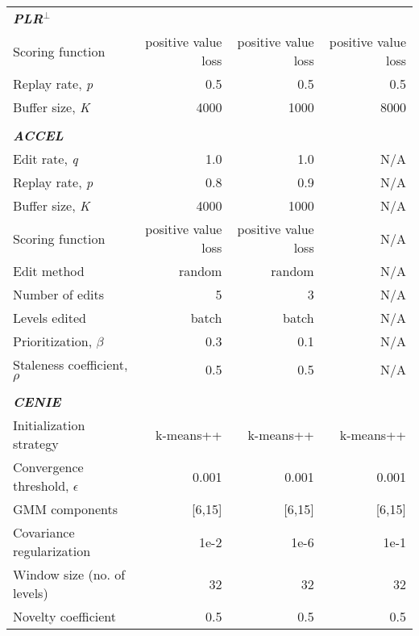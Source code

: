 \begin{table}[h]
\begin{tabular}{lrrr}
        \\
        {\em \textbf{PLR}$^\perp$} & \text{ }     & \text{ }  &  \text{ }    \\
        Scoring function   &   positive value loss   & positive value loss  &  positive value loss  \\
        Replay rate, \em{p}    &   0.5    &     0.5   & 0.5     \\
        Buffer size, \em{K}       &  4000   &   1000  &  8000      \\
        \\
        {\em \textbf{ACCEL}}  & \text{ }     & \text{ }   & \text{ }   \\
        Edit rate, \em{q}  &    1.0      &    1.0     & N/A      \\
        Replay rate, \em{p}    &   0.8    &     0.9    & N/A    \\
        Buffer size, \em{K}       &  4000   &   1000    & N/A   \\
        Scoring function   &   positive value loss   & positive value loss & N/A  \\
        Edit method    &    random   & random &  N/A \\
        Number of edits  &  5   &   3 &  N/A \\
        Levels edited     &    batch    &    batch  & N/A  \\
        Prioritization, $\beta$    &    0.3    &    0.1   & N/A  \\
        Staleness coefficient, $\rho$  &     0.5   &     0.5 & N/A \\
        \\
        {\em \textbf{CENIE}}  & \text{ }     & \text{ }    & \text{ }     \\
        Initialization strategy & k-means++ & k-means++ & k-means++ \\
        Convergence threshold, $\epsilon$ &  0.001 & 0.001 & 0.001 \\
        GMM components       & [6,15]            & [6,15]     & [6,15]        \\
        Covariance regularization & 1e-2 & 1e-6 & 1e-1 \\
        Window size (no. of levels)       &  32  & 32  & 32     \\
        Novelty coefficient &  0.5       &  0.5    &  0.5       \\
        \bottomrule
    \end{tabular}
\end{table}
